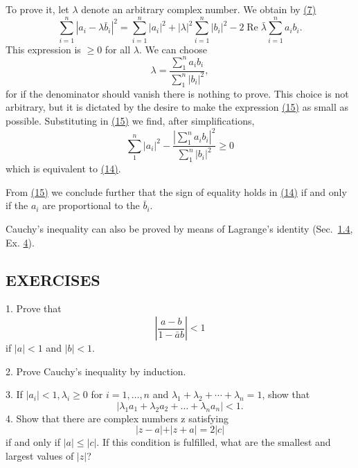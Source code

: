 To prove it, let $\lambda$ denote an arbitrary complex number. We obtain by \hyperref[eq:1.7]{(7)}
\begin{equation*}
\sum_ {i = 1} ^ {n} | a _ {i} - \lambda \bar {b} _ {i} | ^ {2} = \sum_ {i = 1} ^ {n} | a _ {i} | ^ {2} + | \lambda | ^ {2} \sum_ {i = 1} ^ {n} | b _ {i} | ^ {2} - 2 \operatorname{Re} \bar {\lambda} \sum_ {i = 1} ^ {n} a _ {i} b _ {i}.\tag{15}\label{eq:1.15}
\end{equation*}
This expression is $\geq 0$ for all $\lambda$. We can choose
\begin{equation*}
\lambda = \frac {\sum_ {1} ^ {n} a _ {i} b _ {i}}{\sum_ {1} ^ {n} | b _ {i} | ^ {2}},
\end{equation*}
for if the denominator should vanish there is nothing to prove. This choice is not arbitrary, but it is dictated by the desire to make the expression \hyperref[eq:1.15]{(15)} as small as possible. Substituting in \hyperref[eq:1.15]{(15)} we find, after simplifications,
\begin{equation*}
\sum_ {1} ^ {n} \left| a _ {i} \right| ^ {2} - \frac {\left| \sum_ {1} ^ {n} a _ {i} b _ {i} \right| ^ {2}}{\sum_ {1} ^ {n} \left| b _ {i} \right| ^ {2}} \geq 0
\end{equation*}
which is equivalent to \hyperref[eq:1.14]{(14)}.

From \hyperref[eq:1.15]{(15)} we conclude further that the sign of equality holds in \hyperref[eq:1.14]{(14)} if and only if the $a_{i}$ are proportional to the $\bar{b}_{i}$.

Cauchy's inequality can also be proved by means of Lagrange's identity (Sec.~\hyperref[sec:1.1.4]{1.4}, Ex. \hyperref[exercise:1.1.4.3.4]{4}).

\subsection*{EXERCISES}
1. Prove that
\begin{equation*}
\left| \frac {a - b}{1 - \bar {a} b} \right| <   1
\end{equation*}
if $|a| < 1$ and $|b| < 1$.

2. Prove Cauchy's inequality by induction.

3. If $|a_{i}| < 1, \lambda_{i} \geq 0$ for $i = 1, \ldots, n$ and $\lambda_{1} + \lambda_{2} + \cdots + \lambda_{n} = 1$, show that
\begin{equation*}
\left| \lambda_ {1} a _ {1} + \lambda_ {2} a _ {2} + \dots + \lambda_ {n} a _ {n} \right| <   1.
\end{equation*}
4. Show that there are complex numbers z satisfying
\begin{equation*}
\vert z - a \vert + \vert z + a \vert = 2 \vert c \vert
\end{equation*}
if and only if $|a| \leq |c|$. If this condition is fulfilled, what are the smallest and largest values of $|z|$?

